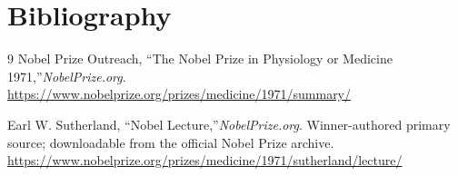 \section{Bibliography}

\begin{thebibliography}{9}
Nobel Prize Outreach, ``The Nobel Prize in Physiology or Medicine 1971,''\emph{NobelPrize.org}.\\
\url{https://www.nobelprize.org/prizes/medicine/1971/summary/}

Earl W. Sutherland, ``Nobel Lecture,''\emph{NobelPrize.org}. Winner-authored primary source; downloadable from the official Nobel Prize archive.\\
\url{https://www.nobelprize.org/prizes/medicine/1971/sutherland/lecture/}
\end{thebibliography}
